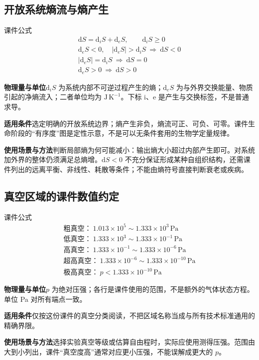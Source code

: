 \documentclass[UTF8,fontset=none,zihao=-4,a4paper]{ctexart}
\newcommand{\unit}[1]{\,\mathrm{#1}}
\newcommand{\explain}[3]{\par\noindent\textbf{物理量与单位}\quad #1\par
\noindent\textbf{适用条件}\quad #2\par
\noindent\textbf{使用场景与方法}\quad #3\par}
\begin{document}
\par\noindent\begin{minipage}{\linewidth}
\subsection{开放系统熵流与熵产生}
\begin{infobox}[breakable=false]{课件公式}
\begin{gather*}\mathrm dS=\mathrm d_iS+\mathrm d_eS,\qquad\mathrm d_iS\ge0\\\mathrm d_eS<0,\quad|\mathrm d_eS|>\mathrm d_iS\ \Longrightarrow\ \mathrm dS<0\\|\mathrm d_eS|=\mathrm d_iS\ \Longrightarrow\ \mathrm dS=0\\\mathrm d_eS>0\ \Longrightarrow\ \mathrm dS>0\end{gather*}
\end{infobox}
\end{minipage}\par
\explain{$\mathrm d_iS$ 为系统内部不可逆过程产生的熵；$\mathrm d_eS$ 为与外界交换能量、物质引起的净熵流入；二者单位均为 $\mathrm{J\,K^{-1}}$。下标 i、e 是产生与交换标签，不是普通求导。}{选定明确的开放系统边界；熵产生非负，熵流可正、可负、可零。课件生命阶段的“有序度”图是定性示意，不是可以无条件套用的生物学定量规律。}{判断局部熵为何可能减小：输出熵大小超过内部产生即可。对系统加外界的整体仍须满足总熵增。$\mathrm dS<0$ 不充分保证形成某种自组织结构，还需课件列出的远离平衡、非线性、耗散等条件；不能由熵符号直接判断衰老或疾病。}


\par\noindent\begin{minipage}{\linewidth}
\subsection{真空区域的课件数值约定}
\begin{infobox}[breakable=false]{课件公式}
\begin{gather*}\text{粗真空：}\ 1.013\times10^5\sim1.333\times10^3\unit{Pa}\\\text{低真空：}\ 1.333\times10^3\sim1.333\times10^{-1}\unit{Pa}\\\text{高真空：}\ 1.333\times10^{-1}\sim1.333\times10^{-6}\unit{Pa}\\\text{超高真空：}\ 1.333\times10^{-6}\sim1.333\times10^{-10}\unit{Pa}\\\text{极高真空：}\ p<1.333\times10^{-10}\unit{Pa}\end{gather*}
\end{infobox}
\end{minipage}\par
\explain{$p$ 为绝对压强；各行是课件使用的范围，不是额外的气体状态方程。单位 Pa 对所有端点一致。}{仅按这份课件的真空分类阅读，不把区域名称当成与所有技术标准通用的精确界限。}{选择实验真空等级或估算自由程时，实际应使用测得压强。范围由大到小列出，课件“真空度高”通常对应更小压强，不能误解成更大的 $p$。}
\end{document}
